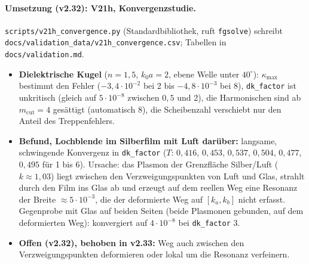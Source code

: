 \paragraph{Umsetzung (v2.32): V21h, Konvergenzstudie.}
\verb|scripts/v21h_convergence.py| (Standardbibliothek, ruft \verb|fgsolve|) schreibt
\verb|docs/validation_data/v21h_convergence.csv|; Tabellen in \verb|docs/validation.md|.
\begin{itemize}[nosep]
  \item \textbf{Dielektrische Kugel} ($n=1{,}5$, $k_0a=2$, ebene Welle unter $40^\circ$): $\kappa_{\max}$ bestimmt den
        Fehler ($-3{,}4\cdot10^{-2}$ bei 2 bis $-4{,}8\cdot10^{-3}$ bei 8), \verb|dk_factor| ist unkritisch (gleich auf
        $5\cdot10^{-8}$ zwischen $0{,}5$ und 2), die Harmonischen sind ab $m_{\text{cut}}=4$ gesättigt (automatisch 8), die
        Scheibenzahl verschiebt nur den Anteil des Treppenfehlers.
  \item \textbf{Befund, Lochblende im Silberfilm mit Luft darüber:} langsame, schwingende Konvergenz in
        \verb|dk_factor| ($T$: $0{,}416$, $0{,}453$, $0{,}537$, $0{,}504$, $0{,}477$, $0{,}495$ für 1 bis 6). Ursache: das Plasmon
        der Grenzfläche Silber/Luft ($k\approx1{,}03$) liegt zwischen den Verzweigungspunkten von Luft und Glas, strahlt
        durch den Film ins Glas ab und erzeugt auf dem reellen Weg eine Resonanz der Breite $\approx5\cdot10^{-3}$, die
        der deformierte Weg auf $[k_a,k_b]$ nicht erfasst. Gegenprobe mit Glas auf beiden Seiten (beide Plasmonen
        gebunden, auf dem deformierten Weg): konvergiert auf $4\cdot10^{-8}$ bei \verb|dk_factor| 3.
  \item \textbf{Offen (v2.32), behoben in v2.33:} Weg auch zwischen den Verzweigungspunkten deformieren oder lokal um
        die Resonanz verfeinern.
\end{itemize}

